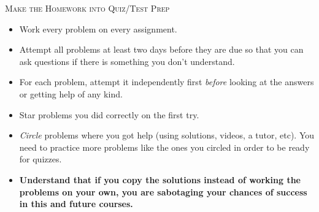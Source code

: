 \documentclass[11pt,fleqn]{article}
\begin{document}
\noindent \textsc{Make the Homework into Quiz/Test Prep}
\begin{itemize}
\item Work every problem on every assignment.
\item Attempt all problems at least two days before they are due so that you can ask questions if there is something you don't understand.
\item For each problem, attempt it independently first \textit{before} looking at the answers or getting help of any kind.
\item Star problems you did correctly on the first try. 
\item \emph{Circle} problems where you got help (using solutions, videos, a tutor, etc). You need to practice more problems like the ones you circled in order to be ready for quizzes.
\item \textbf{Understand that if you copy the solutions instead of working the problems on your own, you are sabotaging your chances of success in this and future courses.}
\end{itemize}
\end{document}
